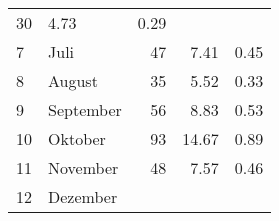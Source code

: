 \begin{longtable}{lXrrr}
       \num{30} &
       \num[round-mode=places,round-precision=2]{4.73} &
         \num[round-mode=places,round-precision=2]{0.29} \\

     7 &
     \multicolumn{1}{X}{ Juli   } &


       \num{47} &
       \num[round-mode=places,round-precision=2]{7.41} &
         \num[round-mode=places,round-precision=2]{0.45} \\

     8 &
     \multicolumn{1}{X}{ August   } &


       \num{35} &
       \num[round-mode=places,round-precision=2]{5.52} &
         \num[round-mode=places,round-precision=2]{0.33} \\

     9 &
     \multicolumn{1}{X}{ September   } &


       \num{56} &
       \num[round-mode=places,round-precision=2]{8.83} &
         \num[round-mode=places,round-precision=2]{0.53} \\

     10 &
     \multicolumn{1}{X}{ Oktober   } &


       \num{93} &
       \num[round-mode=places,round-precision=2]{14.67} &
         \num[round-mode=places,round-precision=2]{0.89} \\

     11 &
     \multicolumn{1}{X}{ November   } &


       \num{48} &
       \num[round-mode=places,round-precision=2]{7.57} &
         \num[round-mode=places,round-precision=2]{0.46} \\

     12 &
     \multicolumn{1}{X}{ Dezember   } &



\end{longtable}
